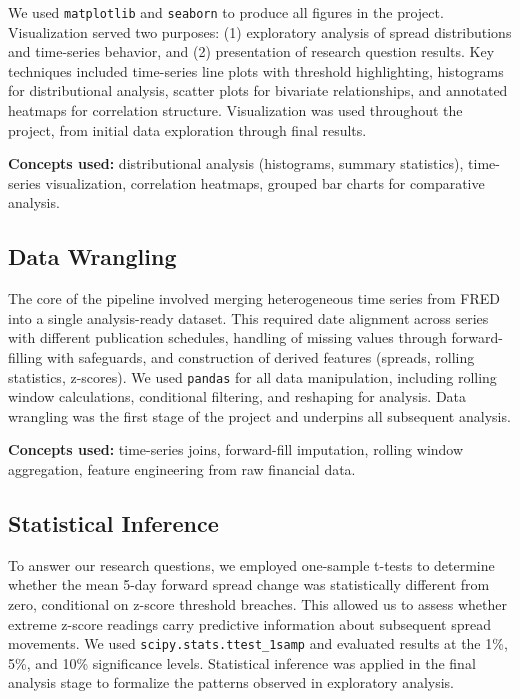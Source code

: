 \documentclass[
  11pt,
  letterpaper,
  DIV=11,
  numbers=noendperiod]{scrartcl}
\begin{document}
We used \texttt{matplotlib} and \texttt{seaborn} to produce all figures
in the project. Visualization served two purposes: (1) exploratory
analysis of spread distributions and time-series behavior, and (2)
presentation of research question results. Key techniques included
time-series line plots with threshold highlighting, histograms for
distributional analysis, scatter plots for bivariate relationships, and
annotated heatmaps for correlation structure. Visualization was used
throughout the project, from initial data exploration through final
results.

\textbf{Concepts used:} distributional analysis (histograms, summary
statistics), time-series visualization, correlation heatmaps, grouped
bar charts for comparative analysis.

\subsection{Data Wrangling}\label{data-wrangling}

The core of the pipeline involved merging heterogeneous time series from
FRED into a single analysis-ready dataset. This required date alignment
across series with different publication schedules, handling of missing
values through forward-filling with safeguards, and construction of
derived features (spreads, rolling statistics, z-scores). We used
\texttt{pandas} for all data manipulation, including rolling window
calculations, conditional filtering, and reshaping for analysis. Data
wrangling was the first stage of the project and underpins all
subsequent analysis.

\textbf{Concepts used:} time-series joins, forward-fill imputation,
rolling window aggregation, feature engineering from raw financial data.

\subsection{Statistical Inference}\label{statistical-inference}

To answer our research questions, we employed one-sample t-tests to
determine whether the mean 5-day forward spread change was statistically
different from zero, conditional on z-score threshold breaches. This
allowed us to assess whether extreme z-score readings carry predictive
information about subsequent spread movements. We used
\texttt{scipy.stats.ttest\_1samp} and evaluated results at the 1\%, 5\%,
and 10\% significance levels. Statistical inference was applied in the
final analysis stage to formalize the patterns observed in exploratory
analysis.
\end{document}
